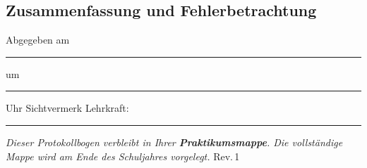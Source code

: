 \documentclass[11pt,a4paper]{scrartcl}
\begin{document}
\subsection*{Zusammenfassung und Fehlerbetrachtung}



	\vspace{0.4cm}
	\begin{tcolorbox}[colback=yellow!8, colframe=black, boxrule=0.6pt, title={\faIcon{check-circle}\enspace Abgabevermerk -- wird vor Ort ausgefüllt}, fonttitle=\bfseries]
		Abgegeben am \rule{2.8cm}{0.4pt} \enspace um \rule{2cm}{0.4pt} Uhr \hfill Sichtvermerk Lehrkraft: \rule{3.5cm}{0.4pt}

		\vspace{0.15cm}
		{\small\textit{Dieser Protokollbogen verbleibt in Ihrer \textbf{Praktikumsmappe}. Die vollständige Mappe wird am Ende des Schuljahres vorgelegt.} \hfill \scriptsize Rev.\,1}
	\end{tcolorbox}
\end{document}
